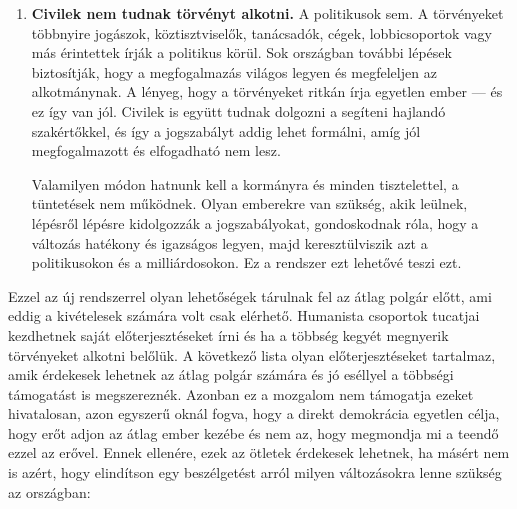 \begin{enumerate}
	      Emellett más szabályokat is be lehet vezetni, hogy a rendszer gyorsan működjön. Például szabhatnánk
	      egy 7 napos határidőt minden javaslatra. Ha az emberek nem jutnak konszenzusra ez idő alatt, a képviselő
	      beletása szerint szavazhat.

	      Azonban az emberek a kezükbe akarják venni az irányítást, és erre nincs jobb annál, mint amikor mi
	      magunk alkotjuk a szabályokat, amelyek szerint élünk. Ha a demokráciában való részvételt könnyűvé
	      tesszük, az emberek részt fognak venni. Az internet erre kiváló eszköz. Végül is ha valamire, arra
	      kiváló, hogy az emberek kinyilvánítsák a véleményüket rajta.

	\item \textbf{Civilek nem tudnak törvényt alkotni.} A politikusok sem. A törvényeket többnyire
	      jogászok, köztisztviselők, tanácsadók, cégek, lobbicsoportok vagy más érintettek írják a politikus
	      körül. Sok országban további lépések biztosítják, hogy a megfogalmazás világos legyen és megfeleljen
	      az  alkotmánynak. A lényeg, hogy a törvényeket ritkán írja egyetlen ember --- és ez így van jól.
	      Civilek is együtt tudnak dolgozni a segíteni hajlandó szakértőkkel, és így a jogszabályt addig
	      lehet formálni, amíg jól megfogalmazott és elfogadható nem lesz.

	      Valamilyen módon hatnunk kell a kormányra és minden tisztelettel, a tüntetések nem működnek. Olyan
	      emberekre van szükség, akik leülnek, lépésről lépésre kidolgozzák a jogszabályokat, gondoskodnak róla,
	      hogy a változás hatékony és igazságos legyen, majd keresztülviszik azt a politikusokon és
	      a milliárdosokon. Ez a rendszer ezt lehetővé teszi ezt.
\end{enumerate}

Ezzel az új rendszerrel olyan lehetőségek tárulnak fel az átlag polgár előtt, ami eddig a kivételesek
számára volt csak elérhető. Humanista csoportok tucatjai kezdhetnek saját előterjesztéseket írni és ha
a többség kegyét megnyerik törvényeket alkotni belőlük. A következő lista olyan előterjesztéseket
tartalmaz, amik érdekesek lehetnek az átlag polgár számára és jó eséllyel a többségi támogatást is
megszereznék. Azonban ez a mozgalom nem támogatja ezeket hivatalosan, azon egyszerű oknál fogva, hogy
a direkt demokrácia egyetlen célja, hogy erőt adjon az átlag ember kezébe és nem az, hogy megmondja
mi a teendő ezzel az erővel. Ennek ellenére, ezek az ötletek érdekesek lehetnek, ha másért
nem is azért, hogy elindítson egy beszélgetést arról milyen változásokra lenne szükség az országban:

